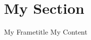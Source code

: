 \documentclass{beamer}
\begin{document}
    \section{My Section}
    \begin{frame}{My Frametitle}
        My Content
    \end{frame}
\end{document}
